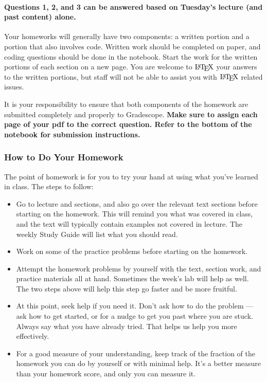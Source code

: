 \documentclass[11pt]{article}
\providecommand{\tightlist}{%
      \setlength{\itemsep}{0pt}\setlength{\parskip}{0pt}}
\let\Oldlatex\LaTeX
\renewcommand{\LaTeX}{\textrm{\Oldlatex}}
\begin{document}
\paragraph{\texorpdfstring{\textbf{Questions 1, 2, and 3 can be answered
based on Tuesday's lecture (and past content)
alone.}}{Questions 1, 2, and 3 can be answered based on Tuesday's lecture (and past content) alone.}}\label{questions-1-2-and-3-can-be-answered-based-on-tuesdays-lecture-and-past-content-alone.}

Your homeworks will generally have two components: a written portion and
a portion that also involves code. Written work should be completed on
paper, and coding questions should be done in the notebook. Start the
work for the written portions of each section on a new page. You are
welcome to \(\LaTeX\) your answers to the written portions, but staff
will not be able to assist you with \(\LaTeX\) related issues.

It is your responsibility to ensure that both components of the homework
are submitted completely and properly to Gradescope. \textbf{Make sure
to assign each page of your pdf to the correct question. Refer to the
bottom of the notebook for submission instructions.}

    \subsubsection{How to Do Your Homework}\label{how-to-do-your-homework}

The point of homework is for you to try your hand at using what you've
learned in class. The steps to follow:

\begin{itemize}
\tightlist
\item
  Go to lecture and sections, and also go over the relevant text
  sections before starting on the homework. This will remind you what
  was covered in class, and the text will typically contain examples not
  covered in lecture. The weekly Study Guide will list what you should
  read.
\item
  Work on some of the practice problems before starting on the homework.
\item
  Attempt the homework problems by yourself with the text, section work,
  and practice materials all at hand. Sometimes the week's lab will help
  as well. The two steps above will help this step go faster and be more
  fruitful.
\item
  At this point, seek help if you need it. Don't ask how to do the
  problem --- ask how to get started, or for a nudge to get you past
  where you are stuck. Always say what you have already tried. That
  helps us help you more effectively.
\item
  For a good measure of your understanding, keep track of the fraction
  of the homework you can do by yourself or with minimal help. It's a
  better measure than your homework score, and only you can measure it.
\end{itemize}
\end{document}
